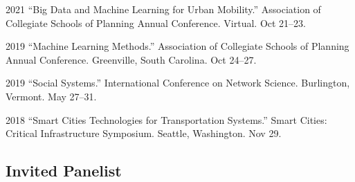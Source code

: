 \documentclass[11pt,letterpaper]{report} %
\begin{document}
    \begin{tablist}

        \item[2021] \tab{}\enquote{Big Data and Machine Learning for Urban Mobility.} Association of Collegiate Schools of Planning Annual Conference. Virtual. Oct 21--23.

        \item[2019] \tab{}\enquote{Machine Learning Methods.} Association of Collegiate Schools of Planning Annual Conference. Greenville, South Carolina. Oct 24--27.

        \item[2019] \tab{}\enquote{Social Systems.} International Conference on Network Science. Burlington, Vermont. May 27--31.

        \item[2018] \tab{}\enquote{Smart Cities Technologies for Transportation Systems.} Smart Cities: Critical Infrastructure Symposium. Seattle, Washington. Nov 29.

    \end{tablist}

    \subsection*{Invited Panelist}
\end{document}
